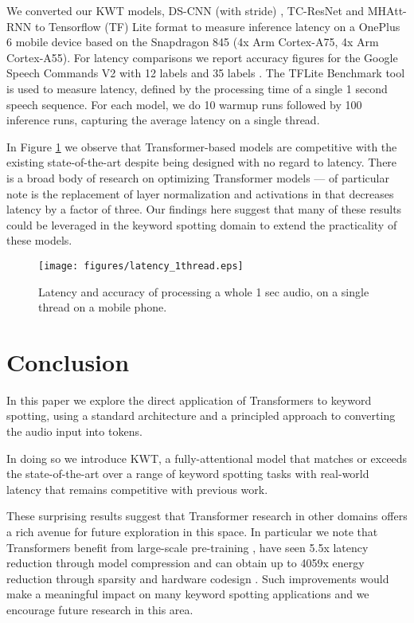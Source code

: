 \documentclass[a4paper]{article}
\begin{document}
We converted our KWT models, DS-CNN (with stride) \cite{zhang2017hello}, TC-ResNet \cite{choi2019temporal} and MHAtt-RNN \cite{rybakov2020streaming} to Tensorflow (TF) Lite format to measure inference latency on a OnePlus 6 mobile device based on the Snapdragon 845 (4x Arm Cortex-A75, 4x Arm Cortex-A55). For latency comparisons we report accuracy figures for the Google Speech Commands V2 with 12 labels and 35 labels \cite{speechv2,rybakov2020streaming}. The TFLite Benchmark tool \cite{TFLite_benchmark} is used to measure latency, defined by the processing time of a single 1 second speech sequence. For each model, we do 10 warmup runs followed by 100 inference runs, capturing the average latency on a single thread.

In Figure \ref{fig:latency} we observe that Transformer-based models are competitive with the existing state-of-the-art despite being designed with no regard to latency. There is a broad body of research on optimizing Transformer models --- of particular note is the replacement of layer normalization and activations in \cite{sun2020mobilebert} that decreases latency by a factor of three. Our findings here suggest that many of these results could be leveraged in the keyword spotting domain to extend the practicality of these models.

\begin{figure}[t]
    \centering
    \texttt{[image: figures/latency\_1thread.eps]}
    \caption{Latency and accuracy of processing a whole 1 sec audio, on a single thread on a mobile phone.}
    \label{fig:latency}
  \end{figure} 
\section{Conclusion}
In this paper we explore the direct application of Transformers to keyword spotting, using a standard architecture and a principled approach to converting the audio input into tokens.

In doing so we introduce KWT, a fully-attentional model that matches or exceeds the state-of-the-art over a range of keyword spotting tasks with real-world latency that remains competitive with previous work.

These surprising results suggest that Transformer research in other domains offers a rich avenue for future exploration in this space. In particular we note that Transformers benefit from large-scale pre-training \cite{dosovitskiy2020image}, have seen 5.5x latency reduction through model compression \cite{sun2020mobilebert} and can obtain up to 4059x energy reduction through sparsity and hardware codesign \cite{wang2021spatten}. Such improvements would make a meaningful impact on many keyword spotting applications and we encourage future research in this area.
\end{document}
